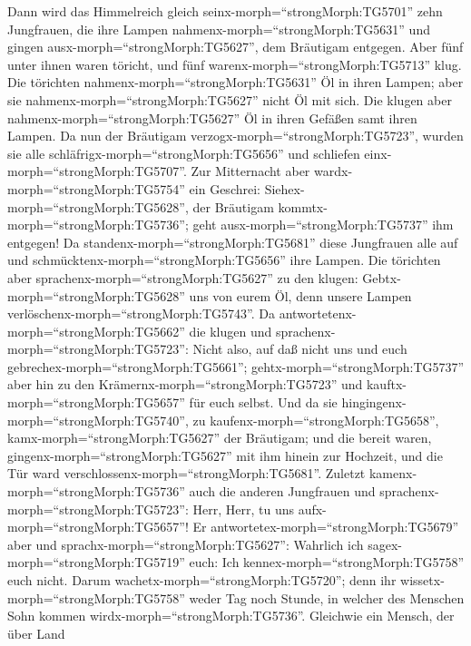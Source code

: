  Dann wird das Himmelreich gleich
seinx-morph=``strongMorph:TG5701'' zehn Jungfrauen, die ihre Lampen
nahmenx-morph=``strongMorph:TG5631'' und gingen
ausx-morph=``strongMorph:TG5627'', dem Bräutigam entgegen. 
Aber fünf unter ihnen waren töricht, und fünf
warenx-morph=``strongMorph:TG5713'' klug.  Die törichten
nahmenx-morph=``strongMorph:TG5631'' Öl in ihren Lampen; aber sie
nahmenx-morph=``strongMorph:TG5627'' nicht Öl mit sich.  Die
klugen aber nahmenx-morph=``strongMorph:TG5627'' Öl in ihren Gefäßen
samt ihren Lampen.  Da nun der Bräutigam
verzogx-morph=``strongMorph:TG5723'', wurden sie alle
schläfrigx-morph=``strongMorph:TG5656'' und schliefen
einx-morph=``strongMorph:TG5707''.  Zur Mitternacht aber
wardx-morph=``strongMorph:TG5754'' ein Geschrei:
Siehex-morph=``strongMorph:TG5628'', der Bräutigam
kommtx-morph=``strongMorph:TG5736''; geht
ausx-morph=``strongMorph:TG5737'' ihm entgegen!  Da
standenx-morph=``strongMorph:TG5681'' diese Jungfrauen alle auf und
schmücktenx-morph=``strongMorph:TG5656'' ihre Lampen.  Die
törichten aber sprachenx-morph=``strongMorph:TG5627'' zu den klugen:
Gebtx-morph=``strongMorph:TG5628'' uns von eurem Öl, denn unsere Lampen
verlöschenx-morph=``strongMorph:TG5743''.  Da
antwortetenx-morph=``strongMorph:TG5662'' die klugen und
sprachenx-morph=``strongMorph:TG5723'': Nicht also, auf daß nicht uns
und euch gebrechex-morph=``strongMorph:TG5661'';
gehtx-morph=``strongMorph:TG5737'' aber hin zu den
Krämernx-morph=``strongMorph:TG5723'' und
kauftx-morph=``strongMorph:TG5657'' für euch selbst.  Und
da sie hingingenx-morph=``strongMorph:TG5740'', zu
kaufenx-morph=``strongMorph:TG5658'', kamx-morph=``strongMorph:TG5627''
der Bräutigam; und die bereit waren,
gingenx-morph=``strongMorph:TG5627'' mit ihm hinein zur Hochzeit, und
die Tür ward verschlossenx-morph=``strongMorph:TG5681''. 
Zuletzt kamenx-morph=``strongMorph:TG5736'' auch die anderen Jungfrauen
und sprachenx-morph=``strongMorph:TG5723'': Herr, Herr, tu uns
aufx-morph=``strongMorph:TG5657''!  Er
antwortetex-morph=``strongMorph:TG5679'' aber und
sprachx-morph=``strongMorph:TG5627'': Wahrlich ich
sagex-morph=``strongMorph:TG5719'' euch: Ich
kennex-morph=``strongMorph:TG5758'' euch nicht.  Darum
wachetx-morph=``strongMorph:TG5720''; denn ihr
wissetx-morph=``strongMorph:TG5758'' weder Tag noch Stunde, in welcher
des Menschen Sohn kommen wirdx-morph=``strongMorph:TG5736''.
 Gleichwie ein Mensch, der über Land
